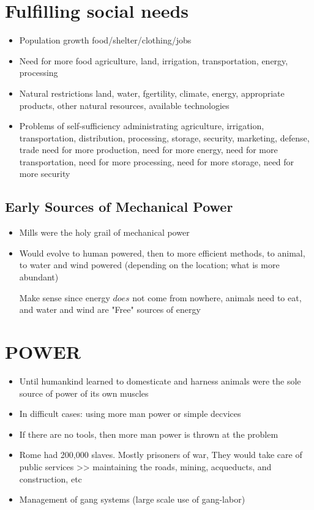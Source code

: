 \documentclass{article}
\begin{document}
\section*{Fulfilling social needs}
\begin{itemize}
  \item Population growth \rightarrow{}
    food/shelter/clothing/jobs
  \item Need for more food \rightarrow{} agriculture,
    land, irrigation, transportation, energy, processing
  \item Natural restrictions \rightarrow{}
    land, water, fgertility, climate, energy, appropriate products, other natural
    resources, available technologies
  \item Problems of self-sufficiency \rightarrow{}
    administrating agriculture, irrigation, transportation,
    distribution, processing, storage, security, marketing,
    defense, trade
    need for more production, need for more energy, need for more
    transportation, need for more processing, need for more
    storage, need for more security
\end{itemize}

\subsection{Early Sources of Mechanical Power}
\begin{itemize}
  \item Mills were the holy grail of mechanical power
  \item Would evolve to human powered, then to more
    efficient methods, to animal, to water and wind powered
    (depending on the location; what is more abundant)

    Make sense since energy $does$ not come from nowhere,
    animals need to eat, and water and wind are "Free" sources of energy
\end{itemize}

\section*{POWER}
\begin{itemize}
  \item Until humankind learned to domesticate and harness
    animals were the sole source of power of its own muscles
  \item In difficult cases: using more man power or simple decvices
  \item If there are no tools, then more man power is thrown at the problem
  \item Rome had 200,000 slaves. Mostly prisoners of war,
    They would take care of public services >> maintaining the roads, mining,
    acqueducts, and construction, etc
  \item Management of gang systems (large scale use of gang-labor)
\end{itemize}
\end{document}
